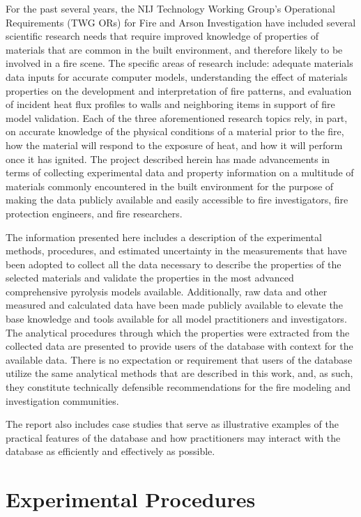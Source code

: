 \documentclass[12pt,oneside]{book}
\begin{document}
For the past several years, the NIJ Technology Working Group's Operational Requirements (TWG ORs) for Fire and Arson Investigation have included several scientific research needs that require improved knowledge of properties of materials that are common in the built environment, and therefore likely to be involved in a fire scene. The specific areas of research include: adequate materials data inputs for accurate computer models, understanding the effect of materials properties on the development and interpretation of fire patterns, and evaluation of incident heat flux profiles to walls and neighboring items in support of fire model validation. Each of the three aforementioned research topics rely, in part, on accurate knowledge of the physical conditions of a material prior to the fire, how the material will respond to the exposure of heat, and how it will perform once it has ignited. The project described herein has made advancements in terms of collecting experimental data and property information on a multitude of materials commonly encountered in the built environment for the purpose of making the data publicly available and easily accessible to fire investigators, fire protection engineers, and fire researchers.

The information presented here includes a description of the experimental methods, procedures, and estimated uncertainty in the measurements that have been adopted to collect all the data necessary to describe the properties of the selected materials and validate the properties in the most advanced comprehensive pyrolysis models available. Additionally, raw data and other measured and calculated data have been made publicly available to elevate the base knowledge and tools available for all model practitioners and investigators. The analytical procedures through which the properties were extracted from the collected data are presented to provide users of the database with context for the available data. There is no expectation or requirement that users of the database utilize the same analytical methods that are described in this work, and, as such, they constitute technically defensible recommendations for the fire modeling and investigation communities.

The report also includes case studies that serve as illustrative examples of the practical features of the database and how practitioners may interact with the database as efficiently and effectively as possible.

\chapter{Experimental Procedures}
\label{sec:experimental}
\end{document}

